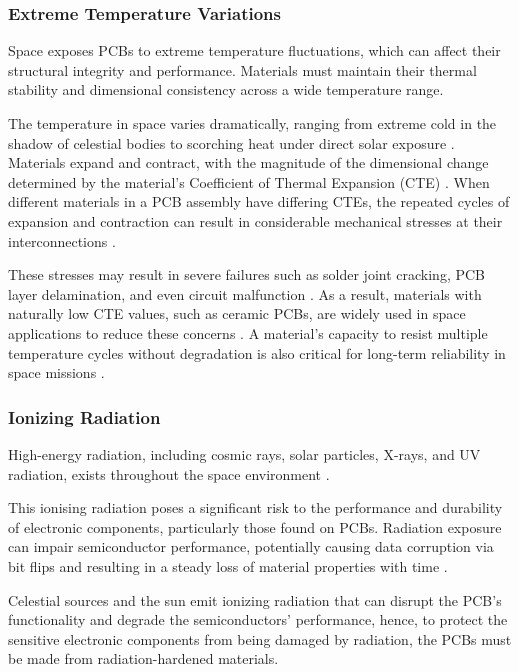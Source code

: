 \subsubsection{Extreme Temperature Variations}
Space exposes PCBs to extreme temperature fluctuations, which can affect 
their structural integrity and performance. Materials must maintain their 
thermal stability and dimensional consistency across a wide temperature range.

The temperature in space varies dramatically, ranging from extreme cold in 
the shadow of celestial bodies to scorching heat under direct solar exposure 
\cite{RefWorks:proto-electronics2024space-grade}. Materials expand and contract, with the magnitude 
of the dimensional change determined by the material's Coefficient of Thermal 
Expansion (CTE) \cite{RefWorks:911eda2024space}. When different materials in a PCB assembly 
have differing CTEs, the repeated cycles of expansion and contraction can result 
in considerable mechanical stresses at their interconnections \cite{RefWorks:proto-electronics2024space-grade}.

These stresses may result in severe failures such as solder joint cracking, 
PCB layer delamination, and even circuit malfunction \cite{RefWorks:proto-electronics2024space-grade}. 
As a result, materials with naturally low CTE values, such as ceramic PCBs, are 
widely used in space applications to reduce these concerns \cite{RefWorks:proto-electronics2024space-grade}. 
A material's capacity to resist multiple temperature cycles without degradation is 
also critical for long-term reliability in space missions \cite{RefWorks:2025applying}.


\subsubsection{Ionizing Radiation}
High-energy radiation, including cosmic rays, solar particles, X-rays, and 
UV radiation, exists throughout the space environment \cite{RefWorks:proto-electronics2024space-grade}.

This ionising radiation poses a significant risk to the performance and durability 
of electronic components, particularly those found on PCBs. Radiation exposure can 
impair semiconductor performance, potentially causing data corruption via bit flips 
and resulting in a steady loss of material properties with time \cite{RefWorks:gatema2024challenges}.

Celestial sources and the sun emit ionizing radiation that can disrupt the PCB's 
functionality and degrade the semiconductors' performance, hence, to protect the 
sensitive electronic components from being damaged by radiation, the PCBs must be 
made from radiation-hardened materials.

